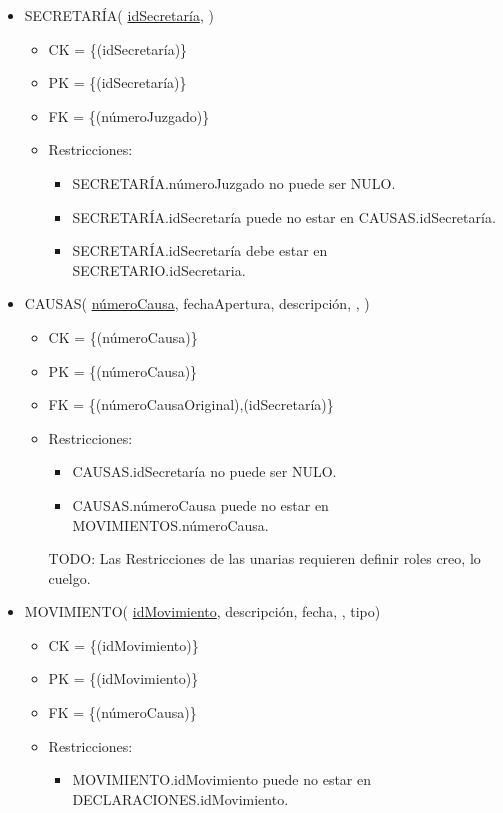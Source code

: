 \begin{itemize}
\item SECRETARÍA( \underline{idSecretaría}, )
	\begin{itemize}
		\item CK = \{(idSecretaría)\}
		\item PK = \{(idSecretaría)\}
		\item FK = \{(númeroJuzgado)\}
		\item Restricciones:
			\begin{itemize}
			\item SECRETARÍA.númeroJuzgado no puede ser NULO.
			\item SECRETARÍA.idSecretaría puede no estar en CAUSAS.idSecretaría.
			\item SECRETARÍA.idSecretaría debe estar en SECRETARIO.idSecretaria.
			\\
			\end{itemize}
	\end{itemize}

	
\item CAUSAS( \underline{númeroCausa}, fechaApertura, descripción, , )
	\begin{itemize}
		\item CK = \{(númeroCausa)\}
		\item PK = \{(númeroCausa)\}
		\item FK = \{(númeroCausaOriginal),(idSecretaría)\}
		\item Restricciones:
			\begin{itemize}
			\item CAUSAS.idSecretaría no puede ser NULO.
			\item CAUSAS.númeroCausa puede no estar en MOVIMIENTOS.númeroCausa.
			\\
			\end{itemize}
			TODO: Las Restricciones de las unarias requieren definir roles creo, lo cuelgo.
	\end{itemize}

	
\item MOVIMIENTO( \underline{idMovimiento}, descripción, fecha, , tipo)
	\begin{itemize}
		\item CK = \{(idMovimiento)\}
		\item PK = \{(idMovimiento)\}
		\item FK = \{(númeroCausa)\}
		\item Restricciones:
			\begin{itemize}
			\item MOVIMIENTO.idMovimiento puede no estar en DECLARACIONES.idMovimiento.
			\\
			\end{itemize}
	\end{itemize} 
	

\end{itemize}
